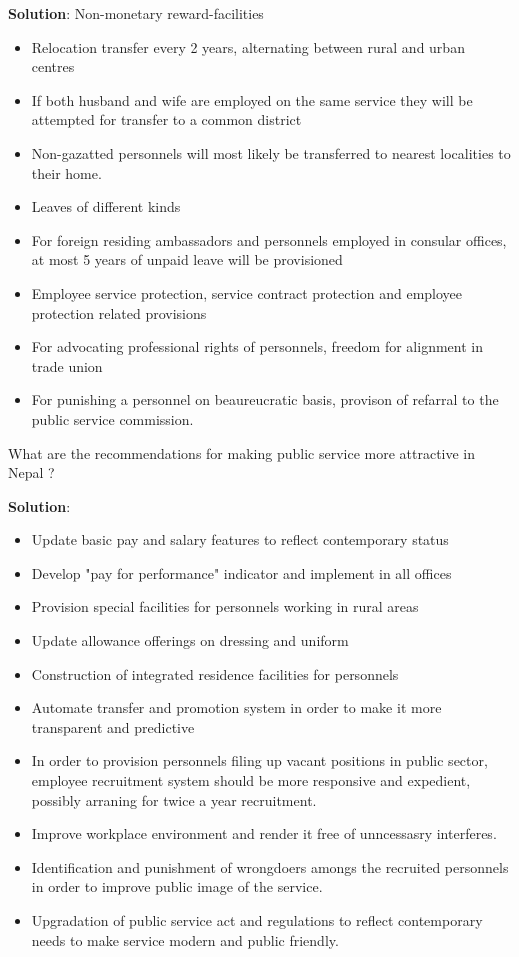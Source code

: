 \documentclass[
]{book}
\newcommand{\question}{\item}
\newenvironment{solution}{ {\bfseries Solution}:}{}
\begin{document}
\begin{questions}
\begin{solution}
Non-monetary reward-facilities

\begin{itemize}
\item Relocation transfer every 2 years, alternating between rural and urban centres
\item If both husband and wife are employed on the same service they will be attempted for transfer to a common district
\item Non-gazatted personnels will most likely be transferred to nearest localities to their home.
\item Leaves of different kinds
\item For foreign residing ambassadors and personnels employed in consular offices, at most 5 years of unpaid leave will be provisioned
\item Employee service protection, service contract protection and employee protection related provisions
\item For advocating professional rights of personnels, freedom for alignment in trade union
\item For punishing a personnel on beaureucratic basis, provison of refarral to the public service commission.
\end{itemize}

\end{solution}

\question What are the recommendations for making public service more attractive in Nepal ?

\begin{solution}
\begin{itemize}
\item Update basic pay and salary features to reflect contemporary status
\item Develop "pay for performance" indicator and implement in all offices
\item Provision special facilities for personnels working in rural areas
\item Update allowance offerings on dressing and uniform
\item Construction of integrated residence facilities for personnels
\item Automate transfer and promotion system in order to make it more transparent and predictive
\item In order to provision personnels filing up vacant positions in public sector, employee recruitment system should be more responsive and expedient, possibly arraning for twice a year recruitment.
\item Improve workplace environment and render it free of unncessasry interferes.
\item Identification and punishment of wrongdoers amongs the recruited personnels in order to improve public image of the service.
\item Upgradation of public service act and regulations to reflect contemporary needs to make service modern and public friendly.
\end{itemize}


\end{solution}
\end{questions}
\end{document}
